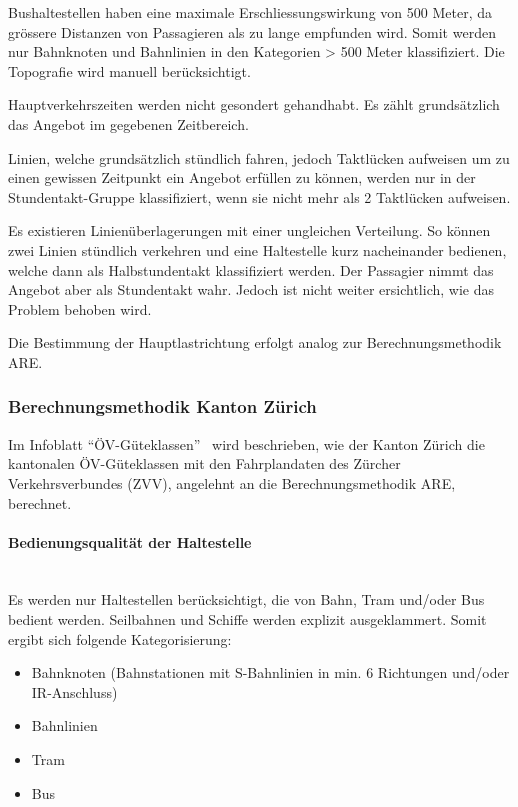 Bushaltestellen haben eine maximale Erschliessungswirkung von 500 Meter, da grössere Distanzen von Passagieren als zu lange empfunden wird.
Somit werden nur Bahnknoten und Bahnlinien in den Kategorien > 500 Meter klassifiziert.
Die Topografie wird manuell berücksichtigt.

Hauptverkehrszeiten werden nicht gesondert gehandhabt.
Es zählt grundsätzlich das Angebot im gegebenen Zeitbereich.

Linien, welche grundsätzlich stündlich fahren, jedoch Taktlücken aufweisen um zu einen gewissen Zeitpunkt ein Angebot erfüllen zu können, werden nur in der Stundentakt-Gruppe klassifiziert, wenn sie nicht mehr als 2 Taktlücken aufweisen.

Es existieren Linienüberlagerungen mit einer ungleichen Verteilung.
So können zwei Linien stündlich verkehren und eine Haltestelle kurz nacheinander bedienen, welche dann als Halbstundentakt klassifiziert werden.
Der Passagier nimmt das Angebot aber als Stundentakt wahr.
Jedoch ist nicht weiter ersichtlich, wie das Problem behoben wird.

Die Bestimmung der Hauptlastrichtung erfolgt analog zur Berechnungsmethodik ARE.


\subsubsection{Berechnungsmethodik Kanton Zürich}
\label{Lösungsansätze:Berechnungsmethodik Kanton Zürich}
Im Infoblatt "`ÖV-Güteklassen"'~\cite{oev-guteklassen-zh} wird beschrieben, wie der Kanton Zürich die kantonalen ÖV-Güteklassen mit den Fahrplandaten des Zürcher Verkehrsverbundes (ZVV), angelehnt an die Berechnungsmethodik \acs{ARE}, berechnet.

\paragraph{Bedienungsqualität der Haltestelle}~\\
\label{Berechnungsmethodik Kanton Zürich:Bedienungsqualität der Haltestelle}
Es werden nur Haltestellen berücksichtigt, die von Bahn, Tram und/oder Bus bedient werden.
Seilbahnen und Schiffe werden explizit ausgeklammert.
Somit ergibt sich folgende Kategorisierung:
\begin{itemize}
    \itemsep -1.5em
    \item Bahnknoten (Bahnstationen mit S-Bahnlinien in min. 6 Richtungen und/oder IR-Anschluss)
    \item Bahnlinien
    \item Tram
    \item Bus
\end{itemize}

